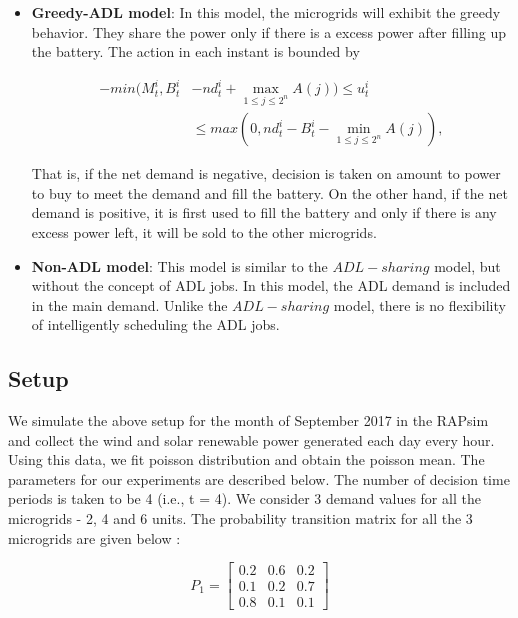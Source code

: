 \begin{itemize}
	\item \textbf{Greedy-ADL model}: In this model, the microgrids will exhibit the greedy behavior. They share the power only if there is a excess power after filling up the battery. The action in each instant is bounded by   
	
	
	\begin{align}
	-min(M_t^i, B_t^i &- nd_t^i + \max_{1\leq j \leq 2^n} A(j) ) \leq u_t^i \nonumber\\ &\leq max(0, nd_t^i - B_t^i - \min_{1\leq j \leq 2^n} A(j)),
	\end{align}
	
	
	
	That is, if the net demand is negative, decision is taken on amount to power to buy to meet the demand and fill the battery. On the other hand, if the net demand is positive, it is first used to fill the battery and only if there is any excess power left, it will be sold to the other microgrids.
	
	\item \textbf{Non-ADL model}:  This model is similar to the $ADL-sharing$ model, but without the concept of ADL jobs. In this model, the ADL demand is included in the main demand. Unlike the $ADL-sharing$ model, there is no flexibility of intelligently scheduling the ADL jobs. 
	
\end{itemize}

\subsection{Setup}


We simulate the above setup for the month of September 2017 in the RAPsim and collect the wind and solar renewable power generated each day every hour. Using this data, we fit poisson distribution and obtain the poisson mean. The parameters for our experiments are described below. The number of decision time periods is taken to be 4 (i.e., t = 4). We consider 3 demand values for all the microgrids - 2, 4 and 6 units. The probability transition matrix for all the 3 microgrids are given below :


\[
P_{1}=
\begin{bmatrix}
0.2 & 0.6 & 0.2 \\
0.1 & 0.2 & 0.7 \\
0.8 & 0.1 & 0.1
\end{bmatrix}
\]

